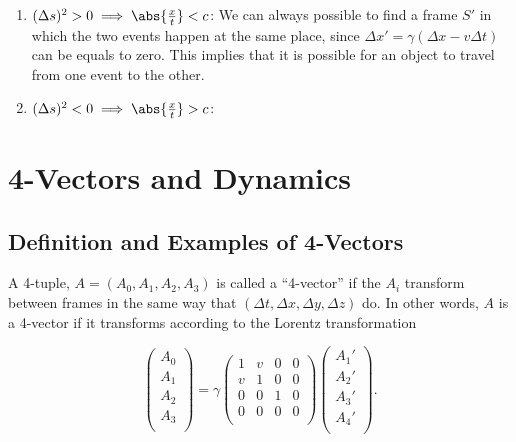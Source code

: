 \documentclass[english,a4paper,12pt]{report}
\begin{document}
\begin{enumerate}
    \item \((\Delta s)^2 > 0 \implies \abs{\frac{x}{t} } < c \): We can always possible to find a frame \(S'\) in which the two events happen at the same place, since \(\Delta x' = \gamma (\Delta x - v\Delta t)\) can be equals to zero. This implies that it is possible for an object to travel from one event to the other.
    \item \((\Delta s)^2 < 0 \implies \abs{\frac{x}{t} } > c \): 
\end{enumerate}























\chapter{4-Vectors and Dynamics}

\section{Definition and Examples of 4-Vectors}

\begin{definition}
A 4-tuple, \(A = (A_0 , A_1 , A_2 , A_3 )\) is called a ``4-vector'' if the \(A_{i} \) transform between frames in the same way that \((\Delta t, \Delta x, \Delta y, \Delta z)\) do. In other words, \(A\) is a 4-vector if it transforms according to the Lorentz transformation

\begin{equation}
    \begin{pmatrix}
         A_0  \\
         A_1  \\
         A_2  \\
         A_3  \\
    \end{pmatrix} = \gamma \begin{pmatrix}
        1  & v & 0 & 0  \\
        v & 1 & 0 & 0  \\
        0 & 0 & 1 & 0  \\
        0 & 0 & 0 & 0  \\
    \end{pmatrix} \begin{pmatrix}
         A_1 ' \\
         A_2 ' \\
         A_3 ' \\
         A_4 ' \\
    \end{pmatrix}.
\end{equation}
\end{definition}
\end{document}
